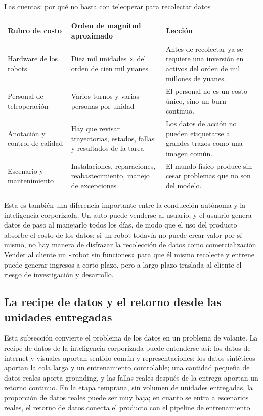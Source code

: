 \documentclass[a4paper]{article}
\begin{document}
\begin{knowledgebox}{Las cuentas: por qué no basta con teleoperar para recolectar datos}
\begin{tabularx}{\textwidth}{p{}p{}X}
\toprule
Rubro de costo & Orden de magnitud aproximado & Lección \\
\midrule
Hardware de los robots & Diez mil unidades $\times$ del orden de cien mil yuanes & Antes de recolectar ya se requiere una inversión en activos del orden de mil millones de yuanes. \\
Personal de teleoperación & Varios turnos y varias personas por unidad & El personal no es un costo único, sino un burn continuo. \\
Anotación y control de calidad & Hay que revisar trayectorias, estados, fallas y resultados de la tarea & Los datos de acción no pueden etiquetarse a grandes trazos como una imagen común. \\
Escenario y mantenimiento & Instalaciones, reparaciones, reabastecimiento, manejo de excepciones & El mundo físico produce sin cesar problemas que no son del modelo. \\
\bottomrule
\end{tabularx}
\end{knowledgebox}

Esta es también una diferencia importante entre la conducción autónoma y la inteligencia corporizada. Un auto puede venderse al usuario, y el usuario genera datos de paso al manejarlo todos los días, de modo que el uso del producto absorbe el costo de los datos; si un robot todavía no puede crear valor por sí mismo, no hay manera de disfrazar la recolección de datos como comercialización. Vender al cliente un «robot sin funciones» para que él mismo recolecte y entrene puede generar ingresos a corto plazo, pero a largo plazo traslada al cliente el riesgo de investigación y desarrollo.

\subsection{La recipe de datos y el retorno desde las unidades entregadas}

Esta subsección convierte el problema de los datos en un problema de volante. La recipe de datos de la inteligencia corporizada puede entenderse así: los datos de internet y visuales aportan sentido común y representaciones; los datos sintéticos aportan la cola larga y un entrenamiento controlable; una cantidad pequeña de datos reales aporta grounding, y las fallas reales después de la entrega aportan un retorno continuo. En la etapa temprana, sin volumen de unidades entregadas, la proporción de datos reales puede ser muy baja; en cuanto se entra a escenarios reales, el retorno de datos conecta el producto con el pipeline de entrenamiento.
\end{document}
